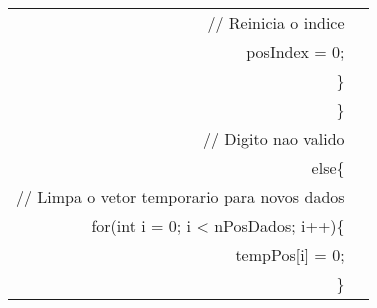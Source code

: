 \begin{longtable}{Rp{15cm}}
  \\
\qquad \qquad \qquad \qquad              // Reinicia o indice \\
\qquad \qquad \qquad \qquad              posIndex = 0; \\
\qquad \qquad \qquad            \} \\
\qquad \qquad      \} \\
\qquad \qquad      // Digito nao valido \\
\qquad \qquad      else\{ \\
\qquad \qquad \qquad        // Limpa o vetor temporario para novos dados \\
\qquad \qquad \qquad        for(int i = 0; i < nPosDados; i++)\{ \\
\qquad \qquad \qquad \qquad          tempPos[i] = 0; \\
\qquad \qquad \qquad        \} \\


\end{longtable}
